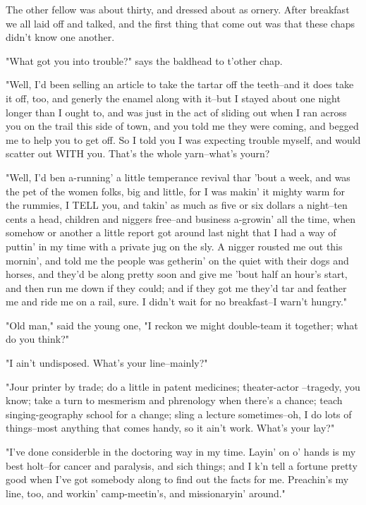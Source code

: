 The other fellow was about thirty, and dressed about as ornery.  After
breakfast we all laid off and talked, and the first thing that come out
was that these chaps didn't know one another.

"What got you into trouble?" says the baldhead to t'other chap.

"Well, I'd been selling an article to take the tartar off the teeth--and
it does take it off, too, and generly the enamel along with it--but I
stayed about one night longer than I ought to, and was just in the act of
sliding out when I ran across you on the trail this side of town, and you
told me they were coming, and begged me to help you to get off.  So I
told you I was expecting trouble myself, and would scatter out WITH you.
That's the whole yarn--what's yourn?

"Well, I'd ben a-running' a little temperance revival thar 'bout a week,
and was the pet of the women folks, big and little, for I was makin' it
mighty warm for the rummies, I TELL you, and takin' as much as five or
six dollars a night--ten cents a head, children and niggers free--and
business a-growin' all the time, when somehow or another a little report
got around last night that I had a way of puttin' in my time with a
private jug on the sly.  A nigger rousted me out this mornin', and told
me the people was getherin' on the quiet with their dogs and horses, and
they'd be along pretty soon and give me 'bout half an hour's start, and
then run me down if they could; and if they got me they'd tar and feather
me and ride me on a rail, sure.  I didn't wait for no breakfast--I warn't
hungry."

"Old man," said the young one, "I reckon we might double-team it
together; what do you think?"

"I ain't undisposed.  What's your line--mainly?"

"Jour printer by trade; do a little in patent medicines; theater-actor
--tragedy, you know; take a turn to mesmerism and phrenology when there's a
chance; teach singing-geography school for a change; sling a lecture
sometimes--oh, I do lots of things--most anything that comes handy, so it
ain't work.  What's your lay?"

"I've done considerble in the doctoring way in my time.  Layin' on o'
hands is my best holt--for cancer and paralysis, and sich things; and I
k'n tell a fortune pretty good when I've got somebody along to find out
the facts for me.  Preachin's my line, too, and workin' camp-meetin's,
and missionaryin' around."

